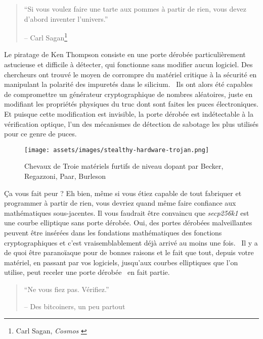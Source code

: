 \begin{quotation}\begin{samepage}
\enquote{Si vous voulez faire une tarte aux pommes à partir de rien, vous devez
d'abord inventer l'univers.}
\begin{flushright} -- Carl Sagan\footnote{Carl Sagan, \textit{Cosmos}
\cite{cosmos}}
\end{flushright}\end{samepage}\end{quotation}

Le piratage de Ken Thompson consiste en une porte dérobée particulièrement
astucieuse et difficile à détecter, qui fonctionne sans modifier aucun logiciel.
Des chercheurs ont trouvé le moyen de corrompre du matériel critique à la
sécurité en manipulant la polarité des impuretés dans le
silicium.~\cite{becker2013stealthy} Ils ont alors été capables de compromettre
un générateur cryptographique de nombres aléatoires, juste en modifiant les
propriétés physiques du truc dont sont faites les puces électroniques. Et
puisque cette modification est invisible, la porte dérobée est indétectable à la
vérification optique, l'un des mécanismes de détection de sabotage les plus
utilisés pour ce genre de puces.

\begin{figure}
  \texttt{[image: assets/images/stealthy-hardware-trojan.png]}
  \caption{Chevaux de Troie matériels furtifs de niveau dopant par Becker,
  Regazzoni, Paar, Burleson}
  \label{fig:stealthy-hardware-trojan}
\end{figure}

Ça vous fait peur ? Eh bien, même si vous étiez capable de tout fabriquer et
programmer à partir de rien, vous devriez quand même faire confiance aux
mathématiques sous-jacentes. Il vous faudrait être convaincu que
\textit{secp256k1} est une courbe elliptique sans porte dérobée. Oui, des portes
dérobées malveillantes peuvent être insérées dans les fondations mathématiques
des fonctions cryptographiques et c'est vraisemblablement déjà arrivé au moins
une fois.~\cite{wiki:Dual_EC_DRBG} Il y a de quoi être paranoïaque pour de
bonnes raisons et le fait que tout, depuis votre matériel, en passant par vos
logiciels, jusqu'aux courbes elliptiques que l'on utilise, peut receler une
porte dérobée~\cite{wiki:backdoors} en fait partie.

\begin{quotation}\begin{samepage}
\enquote{Ne vous fiez pas. Vérifiez.}
\begin{flushright} -- Des bitcoiners, un peu partout
\end{flushright}\end{samepage}\end{quotation}

